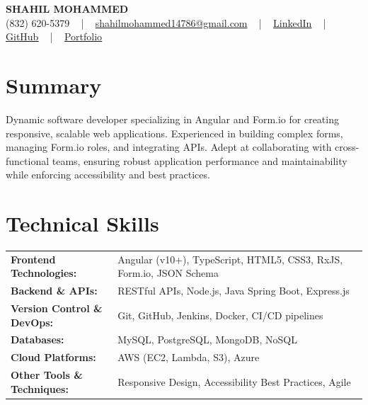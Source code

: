 \documentclass[letterpaper,11pt]{article}
\begin{document}
\begin{center}
    {\fontsize{14pt}{12pt}\selectfont \textbf{\MakeUppercase{Shahil Mohammed}}}\\ \vspace{2pt}
    \fontsize{10pt}{12pt}\selectfont (832) 620-5379 ~ | ~ \href{mailto:shahilmohammed14786@gmail.com}{shahilmohammed14786@gmail.com} ~ | ~  
    \href{https://www.linkedin.com/in/shahil-mohammed-9652931a1/}{\color{blue}\underline{LinkedIn}}  ~ | ~ 
    \href{https://github.com/freakbeast14}{\color{blue}\underline{GitHub}} ~ | ~ 
    \href{https://shahil-mohammed.netlify.app/}{\color{blue}\underline{Portfolio}}
    \vspace{-8pt}
\end{center}

\section{Summary}
\fontsize{9pt}{10pt}\selectfont
Dynamic software developer specializing in Angular and Form.io for creating responsive, scalable web applications. Experienced in building complex forms, managing Form.io roles, and integrating APIs. Adept at collaborating with cross-functional teams, ensuring robust application performance and maintainability while enforcing accessibility and best practices.
 \vspace{-5pt}
 
\section{Technical Skills}
        \vspace{-14pt}
        \begin{table}[h]
            \fontsize{9pt}{10pt}\selectfont
            \begin{tabular}{p{0.3\linewidth} p{0.7\linewidth}}
                \textbf{Frontend Technologies:} & Angular (v10+), TypeScript, HTML5, CSS3, RxJS, Form.io, JSON Schema \\
                \textbf{Backend \& APIs:} & RESTful APIs, Node.js, Java Spring Boot, Express.js \\
                \textbf{Version Control \& DevOps:} & Git, GitHub, Jenkins, Docker, CI/CD pipelines \\
                \textbf{Databases:} & MySQL, PostgreSQL, MongoDB, NoSQL \\
                \textbf{Cloud Platforms:} & AWS (EC2, Lambda, S3), Azure \\
                \textbf{Other Tools \& Techniques:} & Responsive Design, Accessibility Best Practices, Agile \\
            \end{tabular}
        \end{table}
 \vspace{-15pt}
 
\end{document}
